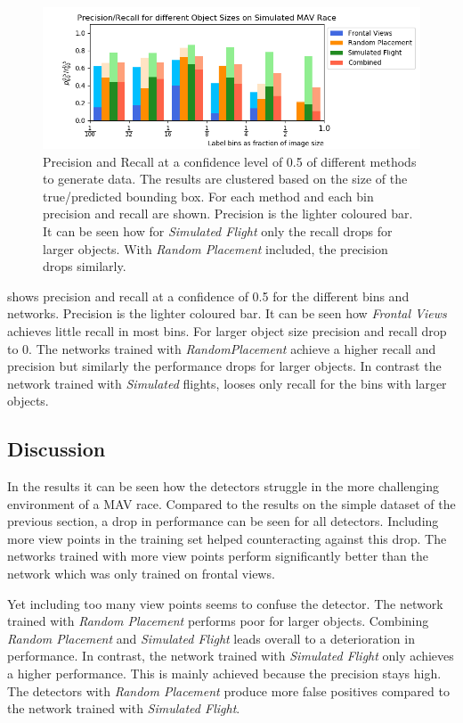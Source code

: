 \begin{figure}[hbtp]
	\includegraphics[width=\textwidth]{fig/view_precision_recall}
	\caption{Precision and Recall at a confidence level of 0.5 of different methods to generate data. The results are clustered based on the size of the true/predicted bounding box. For each method and each bin precision and recall are shown. Precision is the lighter coloured bar. It can be seen how for \textit{Simulated Flight} only the recall drops for larger objects. With \textit{Random Placement} included, the precision drops similarly.}
	\label{fig:view_size_pr}
\end{figure}

 shows precision and recall at a confidence of 0.5 for the different bins and networks. Precision is the lighter coloured bar. It can be seen how \textit{Frontal Views} achieves little recall in most bins. For larger object size precision and recall drop to 0. The networks trained with \textit{RandomPlacement} achieve a higher recall and precision but similarly the performance drops for larger objects. In contrast the network trained with \textit{Simulated} flights, looses only recall for the bins with larger objects.

\subsection{Discussion}

In the results it can be seen how the detectors struggle in the more challenging environment of a \ac{MAV} race. Compared to the results on the simple dataset of the previous section, a drop in performance can be seen for all detectors. Including more view points in the training set helped counteracting against this drop. The networks trained with more view points perform significantly better than the network which was only trained on frontal views.

Yet including too many view points seems to confuse the detector. The network trained with \textit{Random Placement} performs poor for larger objects. Combining \textit{Random Placement} and \textit{Simulated Flight} leads overall to a deterioration in performance. In contrast, the network trained with \textit{Simulated Flight} only achieves a higher performance. This is mainly achieved because the precision stays high. The detectors with \textit{Random Placement} produce more false positives compared to the network trained with \textit{Simulated Flight}.

